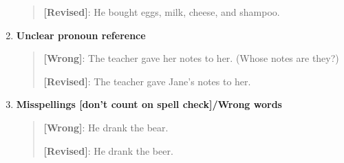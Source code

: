\begin{enumerate}
\begin{quote}
\textbf{[Revised]}: He bought eggs, milk, cheese, and shampoo. 
\end{quote}


\item \textbf{Unclear pronoun reference}
\begin{quote}
\textbf{[Wrong]}: The teacher gave her notes to her. (Whose notes are they?)

\textbf{[Revised]}: The teacher gave Jane's notes to her.
\end{quote}
\item \textbf{Misspellings [don't count on spell check]/Wrong words}
\begin{quote}
\textbf{[Wrong]}: He drank the bear.

\textbf{[Revised]}: He drank the beer.
\end{quote}
\end{enumerate}
